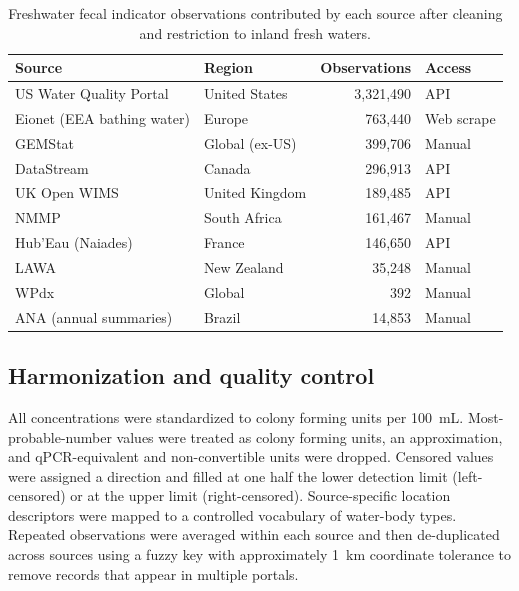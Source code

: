 \documentclass{agujournal2019}
\begin{document}
\begin{table}
\caption{Freshwater fecal indicator observations contributed by each source after cleaning and restriction to inland fresh waters.}
\centering
\begin{tabular}{l l r l}
\hline
Source & Region & Observations & Access \\
\hline
US Water Quality Portal & United States & 3{,}321{,}490 & API \\
Eionet (EEA bathing water) & Europe & 763{,}440 & Web scrape \\
GEMStat & Global (ex-US) & 399{,}706 & Manual \\
DataStream & Canada & 296{,}913 & API \\
UK Open WIMS & United Kingdom & 189{,}485 & API \\
NMMP & South Africa & 161{,}467 & Manual \\
Hub'Eau (Naiades) & France & 146{,}650 & API \\
LAWA & New Zealand & 35{,}248 & Manual \\
WPdx & Global & 392 & Manual \\
ANA (annual summaries) & Brazil & 14{,}853 & Manual \\
\hline
\end{tabular}
\label{tab:sources}
\end{table}

\subsection{Harmonization and quality control}
All concentrations were standardized to colony forming units per 100~mL. Most-probable-number values were treated as colony forming units, an approximation, and qPCR-equivalent and non-convertible units were dropped. Censored values were assigned a direction and filled at one half the lower detection limit (left-censored) or at the upper limit (right-censored). Source-specific location descriptors were mapped to a controlled vocabulary of water-body types. Repeated observations were averaged within each source and then de-duplicated across sources using a fuzzy key with approximately 1~km coordinate tolerance to remove records that appear in multiple portals.
\end{document}
